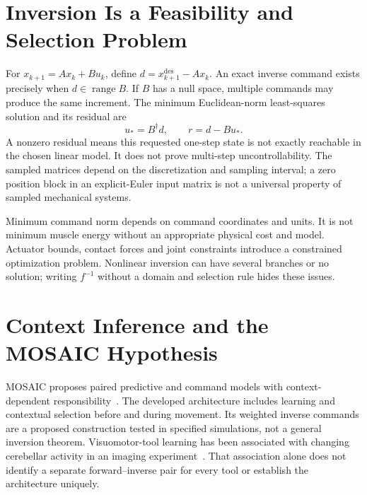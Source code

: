 \section{Inversion Is a Feasibility and Selection Problem}

For $x_{k+1}=Ax_k+Bu_k$, define $d=x_{k+1}^{\mathrm{des}}-Ax_k$.
An exact inverse command exists precisely when $d\in\operatorname{range}B$.
If $B$ has a null space, multiple commands may produce the same increment.
The minimum Euclidean-norm least-squares solution and its residual are
\begin{equation}
 u_*=B^\dagger d,\qquad r=d-Bu_*.
 \label{eq:ch6:inverse-model}
\end{equation}
A nonzero residual means this requested one-step state is not exactly
reachable in the chosen linear model. It does not prove multi-step
uncontrollability. The sampled matrices depend on the discretization and
sampling interval; a zero position block in an explicit-Euler input matrix
is not a universal property of sampled mechanical systems.

Minimum command norm depends on command coordinates and units. It is not
minimum muscle energy without an appropriate physical cost and model.
Actuator bounds, contact forces and joint constraints introduce a constrained
optimization problem. Nonlinear inversion can have several branches or no
solution; writing $f^{-1}$ without a domain and selection rule hides these issues.

\section{Context Inference and the MOSAIC Hypothesis}

MOSAIC proposes paired predictive and command models with context-dependent
responsibility~\cite{WolpertKawato1998,HarunoMosaic2001Review}. The developed
architecture includes learning and contextual selection before and during
movement. Its weighted inverse commands are a proposed construction tested
in specified simulations, not a general inversion theorem.
Visuomotor-tool learning has been associated with changing cerebellar activity
in an imaging experiment~\cite{Imamizu2000}. That association alone does not
identify a separate forward--inverse pair for every tool or establish the
architecture uniquely.

